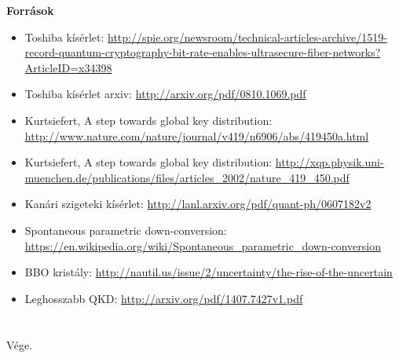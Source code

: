 \documentclass{beamer}
\begin{document}
    \begin{frame}

        \center

        \textbf{Források}

        \tiny

        \begin{itemize}
            \item Toshiba kísérlet: \url{http://spie.org/newsroom/technical-articles-archive/1519-record-quantum-cryptography-bit-rate-enables-ultrasecure-fiber-networks?ArticleID=x34398}
            \item Toshiba kísérlet arxiv: \url{http://arxiv.org/pdf/0810.1069.pdf}
            \item Kurtsiefert, A step towards global key distribution: \url{http://www.nature.com/nature/journal/v419/n6906/abs/419450a.html}
            \item Kurtsiefert, A step towards global key distribution: \url{http://xqp.physik.uni-muenchen.de/publications/files/articles\_2002/nature\_419\_450.pdf}
            \item Kanári szigeteki kísérlet: \url{http://lanl.arxiv.org/pdf/quant-ph/0607182v2}
            \item Spontaneous parametric down-conversion: \url{https://en.wikipedia.org/wiki/Spontaneous_parametric_down-conversion}
            \item BBO kristály: \url{http://nautil.us/issue/2/uncertainty/the-rise-of-the-uncertain}
            \item Leghosszabb QKD: \url{http://arxiv.org/pdf/1407.7427v1.pdf}
        \end{itemize}

    \end{frame}

    \section{}

    \begin{frame}
        \centering
        Vége.
    \end{frame}
\end{document}
